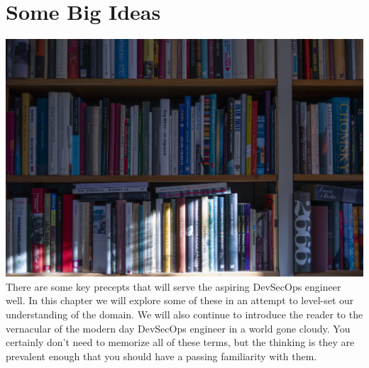 \chapter{Some Big Ideas}
\includegraphics{../images/book-5104342_1920.jpg}
\justify{}
There are some key precepts that will serve the aspiring DevSecOps engineer well. In this
chapter we will explore some of these in an attempt to level-set our understanding of the
domain. We will also continue to introduce the reader to the vernacular of the modern day
DevSecOps engineer in a world gone cloudy. You certainly don't need to memorize all of 
these terms, but the thinking is they are prevalent enough that you should have a passing 
familiarity with them. 
